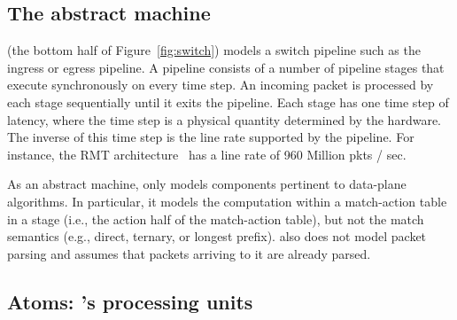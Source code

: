 \subsection{The \absmachine abstract machine}

\absmachine (the bottom half of Figure~\ref{fig:switch}) models a switch
pipeline such as the ingress or egress pipeline. A pipeline consists of a
number of pipeline stages that execute synchronously on every time step. An
incoming packet is processed by each stage sequentially until it exits the
pipeline. Each stage has one time step of latency, where the time step
is a physical quantity determined by the hardware. The inverse of this time
step is the line rate supported by the pipeline. For instance, the RMT
architecture~\cite{rmt} has a line rate of 960 Million pkts / sec.

As an abstract machine, \absmachine only models components pertinent to
data-plane algorithms. In particular, it models the computation within
a match-action table in a stage (i.e., the action half of the match-action
table), but not the match semantics (e.g., direct, ternary, or longest prefix).
\absmachine also does not model packet parsing and assumes that packets
arriving to it are already parsed.


\subsection{Atoms: \absmachine's processing units}

